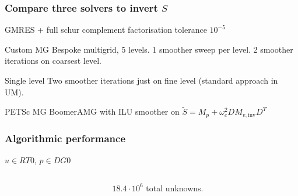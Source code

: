 \documentclass[presentation]{beamer}
\begin{document}
\begin{frame}
  \frametitle{Compare three solvers to invert $S$}
  GMRES + full schur complement factorisation tolerance $10^{-5}$

  \begin{block}{Custom MG}
    Bespoke multigrid, 5 levels.  1 smoother sweep per level.  2
    smoother iterations on coarsest level.
  \end{block}

  \begin{block}{Single level}
    Two smoother iterations just on fine level (standard approach in UM).
  \end{block}

  \begin{block}{PETSc MG}
    BoomerAMG with ILU smoother on $\tilde{S} = M_p + \omega_c^2 D M_{v,\text{inv}} D^T$
  \end{block}
\end{frame}
\begin{frame}
  \frametitle{Algorithmic performance}

  $u \in RT0$, $p \in DG0$
  \begin{columns}
    \begin{column}{0.75\textwidth}
    \end{column}
    \begin{column}{0.25\textwidth}
      $18.4\cdot 10^6$ total unknowns.
    \end{column}
  \end{columns}
\end{frame}
\end{document}
